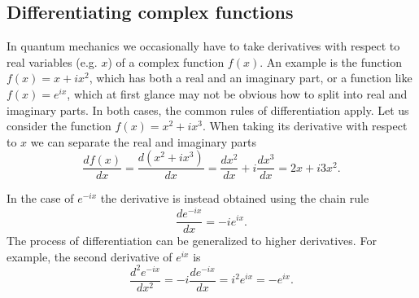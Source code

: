 \subsection{Differentiating complex functions}
In quantum mechanics we occasionally have to take derivatives with respect to real variables (e.g. $x$) of a complex function $f(x)$.
An example is the function $f(x) = x + i x^2 $, which has both a real and an imaginary part, or a function like $f(x) = e^{i x}$, which at first glance may not be obvious how to split into real and imaginary parts.
In both cases, the common rules of differentiation apply.
Let us consider the function $f(x) = x^2 + i x^3$. When taking its derivative with respect to $x$ we can separate the real and imaginary parts
\begin{equation}
\frac{d f(x)}{dx } = \frac{ d (x^2 + i x^3)}{dx} = \frac{ d x^2}{dx}  + i \frac{ d x^3}{dx} = 2x + i3 x^2.
\end{equation}

In the case of $e^{-i x}$ the derivative is instead obtained using the chain rule
\begin{equation}
\frac{d e^{-i x}}{dx} = - i e^{i x}.
\end{equation}
The process of differentiation can be generalized to higher derivatives. For example, the second derivative of $e^{i x}$ is 
\begin{equation}
\frac{d^2 e^{-i x}}{dx^2} = -i \frac{d e^{-i x}}{dx} = i^2 e^{i x} = - e^{i x}.
\end{equation}



 
